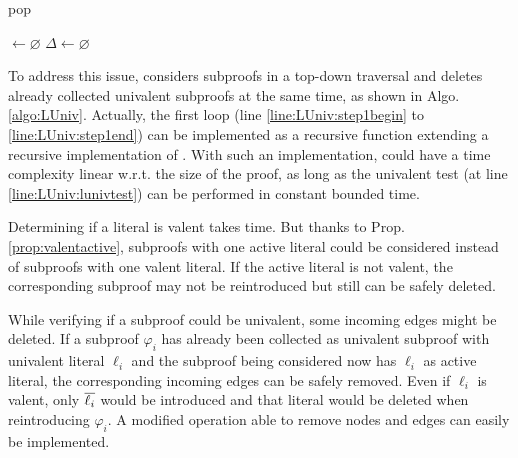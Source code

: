 \documentclass{llncs}
\begin{document}
\begin{algorithm}[bt]
  \BlankLine

   {pop}

  \Univ $\leftarrow \varnothing$ \;
  $\Delta \leftarrow \varnothing$ \;
  \BlankLine

  \BlankLine


  \caption{\LowerUnivalents}
  \label{algo:LUniv}
\end{algorithm}

To address this issue, {\LowerUnivalents} considers subproofs in a top-down traversal and deletes
already collected univalent subproofs at the same time, as shown in Algo. \ref{algo:LUniv}.
Actually, the first loop (line \ref{line:LUniv:step1begin} to \ref{line:LUniv:step1end}) can be
implemented as a recursive function extending a recursive implementation of . With
such an implementation, {\LowerUnivalents} could have a time complexity linear w.r.t. the size of
the proof, as long as the univalent test (at line \ref{line:LUniv:lunivtest}) can be performed in
constant bounded time.

Determining if a literal is valent takes time. But thanks to Prop. \ref{prop:valentactive},
subproofs with one active literal could be considered instead of subproofs with one valent literal.
If the active literal is not valent, the corresponding subproof may not be reintroduced but still can
be safely deleted.

While verifying if a subproof could be univalent, some incoming edges might be deleted. If a
subproof $\varphi_i$ has already been collected as univalent subproof with univalent literal
$\ell_i$ and the subproof being considered now has $\ell_i$ as active literal, the corresponding
incoming edges can be safely removed. Even if $\ell_i$ is valent, only $\overline{\ell_i}$ would be
introduced and that literal would be deleted when reintroducing $\varphi_i$. A modified
 operation able to remove nodes and edges can easily be implemented.
\end{document}
